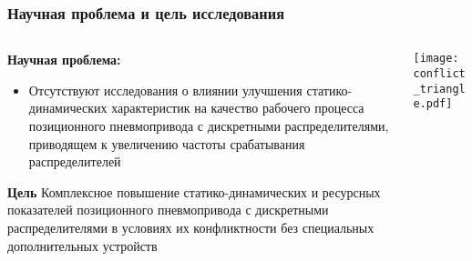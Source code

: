 \begin{frame}
	\frametitle{Научная проблема и цель исследования}

	\begin{columns}
		\begin{column}{0.48\textwidth}
			\textbf{Научная проблема:}
			\begin{itemize}
				\item \scriptsize Отсутствуют исследования о влиянии улучшения статико-динамических
				      характеристик на качество рабочего процесса позиционного пневмопривода с дискретными
				      распределителями, приводящем к увеличению частоты срабатывания распределителей
			\end{itemize}

			\vspace{0.15cm}
			\begin{block}{\textbf{Цель}}
				\scriptsize Комплексное повышение статико-динамических и ресурсных показателей позиционного пневмопривода
				с дискретными распределителями в условиях их конфликтности без специальных дополнительных устройств
			\end{block}

		\end{column}

		\begin{column}{0.48\textwidth}
			\centering
			\texttt{[image: conflict\_triangle.pdf]}
		\end{column}
	\end{columns}
\end{frame}

